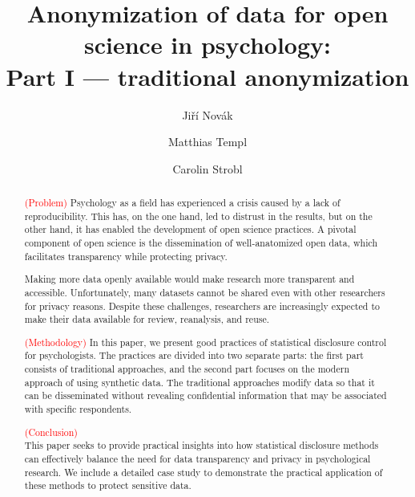 \documentclass{article}
\title{Anonymization of data for open science in psychology: \\ 
       Part I — traditional anonymization
}
\author{Jiří Novák \and 
        Matthias Templ \and 
        Carolin Strobl
        }
\begin{document}
\maketitle

\begin{abstract}
\textcolor{red}{(Problem)} 
Psychology as a field has experienced a crisis caused by a lack of reproducibility. 
This has, on the one hand, led to distrust in the results, but on the other hand, it has enabled the development of open science practices. 
A pivotal component of open science is the dissemination of well-anatomized open data, which facilitates transparency while protecting privacy.

Making more data openly available would make research more transparent and accessible. Unfortunately, many datasets cannot be shared even with other researchers for privacy reasons. 
Despite these challenges, researchers are increasingly expected to make their data available for review, reanalysis, and reuse.

\textcolor{red}{(Methodology)} 
In this paper, we present good practices of statistical disclosure control for psychologists. 
The practices are divided into two separate parts: the first part consists of traditional approaches, and the second part focuses on the modern approach of using synthetic data.
The traditional approaches modify data so that it can be disseminated without revealing confidential information that may be associated with specific respondents. 

\textcolor{red}{(Conclusion)} \\ 
This paper seeks to provide practical insights into how statistical disclosure methods can effectively balance the need for data transparency and privacy in psychological research.
We include a detailed case study to demonstrate the practical application of these methods to protect sensitive data.

\end{abstract}

\end{document}
